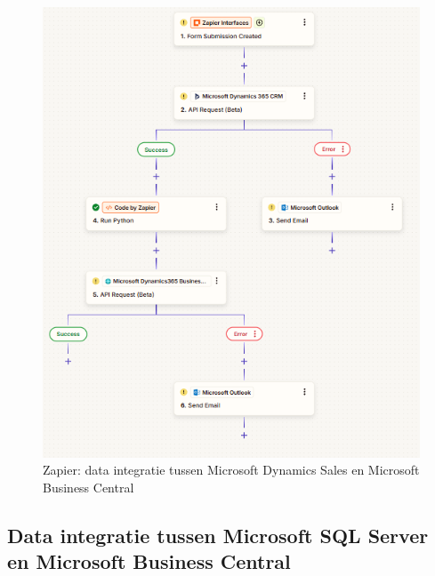 \begin{figure}[H]
    \centering
    \includegraphics[]{../bachproef/images/Zapier_Quote_Creation.png}
    \caption{Zapier: data integratie tussen Microsoft Dynamics Sales en Microsoft Business Central}
\end{figure}

\subsection{Data integratie tussen Microsoft SQL Server en Microsoft Business Central}
\label{ch:Zapier3}

